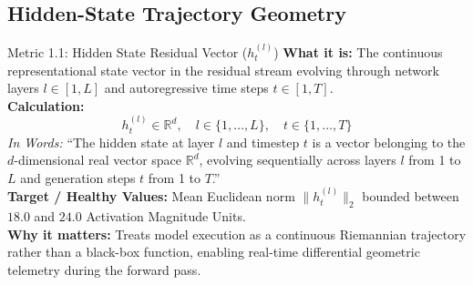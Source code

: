\documentclass[11pt,a4paper]{article}
\begin{document}
\subsection{Hidden-State Trajectory Geometry}
\begin{metricbox}{Metric 1.1: Hidden State Residual Vector ($h^{(l)}_t$)}
\textbf{What it is:} The continuous representational state vector in the residual stream evolving through network layers $l \in [1, L]$ and autoregressive time steps $t \in [1, T]$.\\
\textbf{Calculation:}
 $$h^{(l)}_t \in \mathbb{R}^d, \quad l \in \{1, \dots, L\}, \quad t \in \{1, \dots, T\}$$ \emph{In Words:} ``The hidden state at layer $l$ and timestep $t$ is a vector belonging to the $d$-dimensional real vector space $\mathbb{R}^d$, evolving sequentially across layers $l$ from 1 to $L$ and generation steps $t$ from 1 to $T$.''\\
\textbf{Target / Healthy Values:} Mean Euclidean norm $\|h^{(l)}_t\|_2$ bounded between $18.0$ and $24.0$ Activation Magnitude Units.\\
\textbf{Why it matters:} Treats model execution as a continuous Riemannian trajectory rather than a black-box function, enabling real-time differential geometric telemetry during the forward pass.
\end{metricbox}
\end{document}
